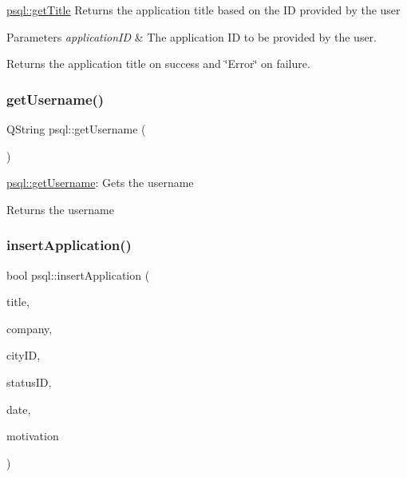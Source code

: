\hyperlink{classpsql_ada9e3be3e0866011edf53e30ec510afc}{psql\+::get\+Title} Returns the application title based on the ID provided by the user 


\begin{DoxyParams}{Parameters}
{\em application\+ID} & The application ID to be provided by the user. \\
\hline
\end{DoxyParams}
\begin{DoxyReturn}{Returns}
the application title on success and \char`\"{}\+Error\char`\"{} on failure. 
\end{DoxyReturn}
\mbox{\label{classpsql_aecc9fd93dc5ca0c4f4a63d445a36d166}} 
\subsubsection{\texorpdfstring{get\+Username()}{getUsername()}}
{\footnotesize\ttfamily Q\+String psql\+::get\+Username (\begin{DoxyParamCaption}{ }\end{DoxyParamCaption})}



\hyperlink{classpsql_aecc9fd93dc5ca0c4f4a63d445a36d166}{psql\+::get\+Username}\+: Gets the username 

\begin{DoxyReturn}{Returns}
the username 
\end{DoxyReturn}
\mbox{\label{classpsql_a03f773904e698853caa0fcdb1f5b3809}} 
\subsubsection{\texorpdfstring{insert\+Application()}{insertApplication()}}
{\footnotesize\ttfamily bool psql\+::insert\+Application (\begin{DoxyParamCaption}\item[{Q\+String}]{title,  }\item[{Q\+String}]{company,  }\item[{int}]{city\+ID,  }\item[{int}]{status\+ID,  }\item[{Q\+String}]{date,  }\item[{Q\+String}]{motivation }\end{DoxyParamCaption})}



